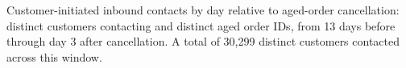 Customer-initiated inbound contacts by day relative to aged-order cancellation: distinct customers contacting and distinct aged order IDs, from 13 days before through day 3 after cancellation. A total of 30,299 distinct customers contacted across this window.
